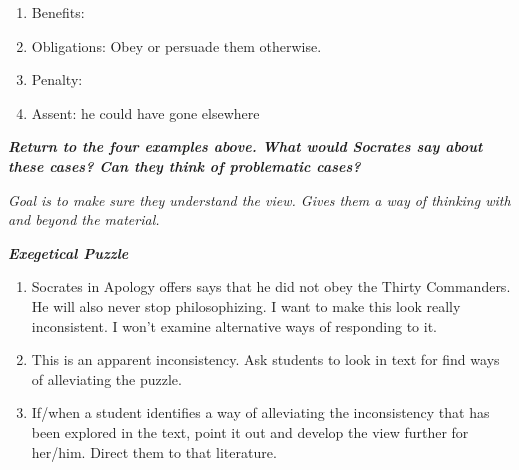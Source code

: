 \documentclass[]{article}
\begin{document}
\begin{enumerate}
\def\labelenumi{\arabic{enumi}.}
\item
  Benefits:
\item
  Obligations: Obey or persuade them otherwise.
\item
  Penalty:
\item
  Assent: he could have gone elsewhere
\end{enumerate}

\textbf{\emph{Return to the four examples above. What would Socrates say
about these cases? Can they think of problematic cases? }}

\emph{Goal is to make sure they understand the view. Gives them a way of
thinking with and beyond the material. }

\textbf{\emph{Exegetical Puzzle}}

\begin{enumerate}
\def\labelenumi{\arabic{enumi}.}
\item
  Socrates in Apology offers says that he did not obey the Thirty
  Commanders. He will also never stop philosophizing. I want to make
  this look really inconsistent. I won't examine alternative ways of
  responding to it.
\item
  This is an apparent inconsistency. Ask students to look in text for
  find ways of alleviating the puzzle.
\item
  If/when a student identifies a way of alleviating the inconsistency
  that has been explored in the text, point it out and develop the view
  further for her/him. Direct them to that literature.
\end{enumerate}
\end{document}
